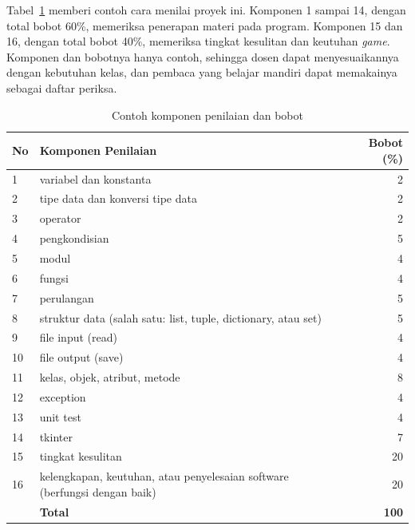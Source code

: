 Tabel~\ref{tab:b15-penilaian} memberi contoh cara menilai proyek ini. Komponen 1 sampai 14, dengan total bobot 60\%, memeriksa penerapan materi pada program. Komponen 15 dan 16, dengan total bobot 40\%, memeriksa tingkat kesulitan dan keutuhan \textit{game}. Komponen dan bobotnya hanya contoh, sehingga dosen dapat menyesuaikannya dengan kebutuhan kelas, dan pembaca yang belajar mandiri dapat memakainya sebagai daftar periksa.

\begin{table}[!htb]
  \centering
  \caption{Contoh komponen penilaian dan bobot}
  \label{tab:b15-penilaian}
  \begin{tabularx}{\textwidth}{lXr}
    \hline
    \textbf{No} & \textbf{Komponen Penilaian} & \textbf{Bobot (\%)} \\
    \hline
    1 & variabel dan konstanta & 2 \\
    \hline
    2 & tipe data dan konversi tipe data & 2 \\
    \hline
    3 & operator & 2 \\
    \hline
    4 & pengkondisian & 5 \\
    \hline
    5 & modul & 4 \\
    \hline
    6 & fungsi & 4 \\
    \hline
    7 & perulangan & 5 \\
    \hline
    8 & struktur data (salah satu: list, tuple, dictionary, atau set) & 5 \\
    \hline
    9 & file input (read) & 4 \\
    \hline
    10 & file output (save) & 4 \\
    \hline
    11 & kelas, objek, atribut, metode & 8 \\
    \hline
    12 & exception & 4 \\
    \hline
    13 & unit test & 4 \\
    \hline
    14 & tkinter & 7 \\
    \hline
    15 & tingkat kesulitan & 20 \\
    \hline
    16 & kelengkapan, keutuhan, atau penyelesaian software (berfungsi dengan baik) & 20 \\
    \hline
    & \textbf{Total} & \textbf{100} \\
    \hline
  \end{tabularx}
\end{table}

